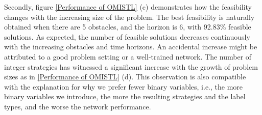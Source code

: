 \documentclass[a4paper]{report}
\begin{document}
Secondly, figure \ref{Performance of OMISTL} (c) demonstrates how the feasibility changes with the increasing size of the problem. The best feasibility is naturally obtained when there are 5 obstacles, and the horizon is 6, with 92.83\% feasible solutions. As expected, the number of feasible solutions decreases continuously with the increasing obstacles and time horizons. An accidental increase might be attributed to a good problem setting or a well-trained network. The number of integer strategies has witnessed a significant increase with the growth of problem sizes as in \ref{Performance of OMISTL} (d). This observation is also compatible with the explanation for why we prefer fewer binary variables, i.e., the more binary variables we introduce, the more the resulting strategies and the label types, and the worse the network performance. 
\end{document}

